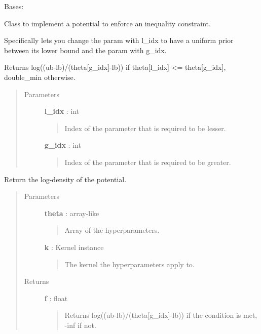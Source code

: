 \documentclass[letterpaper,10pt,english]{sphinxmanual}
\begin{document}
\begin{fulllineitems}
\label{gptools:gptools.utils.LessThanUniformPotential}
Bases: 

Class to implement a potential to enforce an inequality constraint.

Specifically lets you change the param with l\_idx to have a uniform prior
between its lower bound and the param with g\_idx.

Returns log((ub-lb)/(theta{[}g\_idx{]}-lb)) if theta{[}l\_idx{]} \textless{}= theta{[}g\_idx{]},
double\_min otherwise.
\begin{quote}\begin{description}
\item[{Parameters}] \leavevmode
\textbf{l\_idx} : int
\begin{quote}

Index of the parameter that is required to be lesser.
\end{quote}

\textbf{g\_idx} : int
\begin{quote}

Index of the parameter that is required to be greater.
\end{quote}

\end{description}\end{quote}

\begin{fulllineitems}
\label{gptools:gptools.utils.LessThanUniformPotential.__call__}
Return the log-density of the potential.
\begin{quote}\begin{description}
\item[{Parameters}] \leavevmode
\textbf{theta} : array-like
\begin{quote}

Array of the hyperparameters.
\end{quote}

\textbf{k} : Kernel instance
\begin{quote}

The kernel the hyperparameters apply to.
\end{quote}

\item[{Returns}] \leavevmode
\textbf{f} : float
\begin{quote}

Returns log((ub-lb)/(theta{[}g\_idx{]}-lb)) if the condition is met, -inf if not.
\end{quote}

\end{description}\end{quote}

\end{fulllineitems}


\end{fulllineitems}
\end{document}
